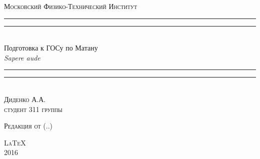 \begin{titlepage}
\centering
\settowidth{\unitlength}{ПОДГОТОВКА К ГОСУ ПО МАТАНУ ыыыыыыыыыыыыыыыыыыыыыыыыыыыыыыыыыы}
\vspace*{\baselineskip}
{\LARGE\scshape Московский Физико-Технический Институт}\\[\baselineskip]
\rule{\unitlength}{1.6pt}\vspace*{-\baselineskip}\vspace*{2pt}
\rule{\unitlength}{0.4pt}\\[1.8\baselineskip]
{\Huge Подготовка к ГОСу по Матану}\\[\baselineskip]
{\large \itshape Sapere aude}\\[0.7\baselineskip]
\rule{\unitlength}{0.4pt}\vspace*{-\baselineskip}\vspace{3.2pt}
\rule{\unitlength}{1.6pt}\\[\baselineskip]
{\Large\scshape Диденко А.А. \\ $ $\\студент 311 группы}\par
\vspace*{5\baselineskip}  %
{\LARGE\scshape Редакция от \currenttime \;(\twodigit\day.\twodigit\month.\the\year)}\par %
\vfill
{\LARGE\scshape \LaTeX}\\[\baselineskip]
{\LARGE\scshape 2016}\par
\end{titlepage}